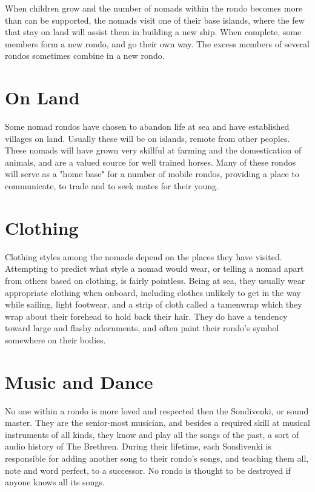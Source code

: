 \begin{multicols*}{2}
When children grow and the number of nomads within the rondo becomes more than can be supported, the nomads visit one of their base islands, where the few that stay on land will assist them in building a new ship. When complete, some members form a new rondo, and go their own way. The excess members of several rondos sometimes combine in a new rondo.

\section{On Land}

Some nomad rondos have chosen to abandon life at sea and have established villages on land. Usually these will be on islands, remote from other peoples. These nomads will have grown very skillful at farming and the domestication of animals, and are a valued source for well trained horses. Many of these rondos will serve as a "home base" for a number of mobile rondos, providing a place to communicate, to trade and to seek mates for their young.

\section{Clothing}

Clothing styles among the nomads depend on the places they have visited. Attempting to predict what style a nomad would wear, or telling a nomad apart from others based on clothing, is fairly pointless. Being at sea, they usually wear appropriate clothing when onboard, including clothes unlikely to get in the way while sailing, light footwear, and a strip of cloth called a tamenwrap which they wrap about their forehead to hold back their hair. They do have a tendency toward large and flashy adornments, and often paint their rondo's symbol somewhere on their bodies.

\section{Music and Dance}

No one within a rondo is more loved and respected then the Sondivenki, or sound master. They are the senior-most musician, and besides a required skill at musical instruments of all kinds, they know and play all the songs of the past, a sort of audio history of The Brethren. During their lifetime, each Sondivenki is responsible for adding another song to their rondo's songs, and teaching them all, note and word perfect, to a successor. No rondo is thought to be destroyed if anyone knows all its songs.


\end{multicols*}
